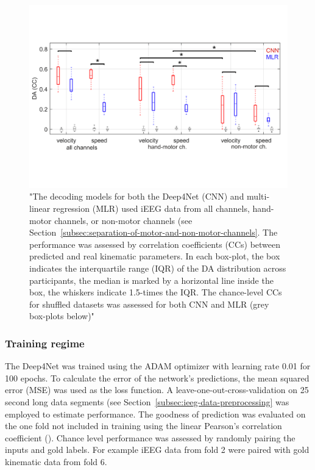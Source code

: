 \begin{figure}[!htpb]
\centering
   \includegraphics[width=0.8\linewidth]{img/ch2/hammer-decoding-acc}
   \caption[Orignial Deep4Net performance]{"The decoding models for both the Deep4Net (CNN) and multi-linear regression (MLR) used iEEG data from all channels, hand-motor channels, or non-motor channels (see Section~\ref{subsec:separation-of-motor-and-non-motor-channels}.
   The performance was assessed by correlation coefficients (CCs) between predicted and real kinematic parameters.
   In each box-plot, the box indicates the interquartile range (IQR) of the DA distribution across participants, the median is marked by a horizontal line inside the box, the whiskers indicate 1.5-times the IQR.
   The chance-level CCs for shuffled datasets was assessed for both CNN and MLR (grey box-plots below)"~\cite{Hammer-2021}}
    \label{fig:hammer-performance}
\end{figure}

\subsubsection{Training regime}
The Deep4Net was trained using the ADAM optimizer with learning rate 0.01 for 100 epochs.
To calculate the error of the network's predictions, the mean squared error (MSE) was used as the loss function.
A leave-one-out-cross-validation on 25 second long data segments (see Section~\ref{subsec:ieeg-data-preprocessing} was employed to estimate performance.
The goodness of prediction was evaluated on the one fold not included in training using the linear Pearson's correlation coefficient (\cite{pearson-vii-1895}).
Chance level performance was assessed by randomly pairing the inputs and gold labels.
For example iEEG data from fold 2 were paired with gold kinematic data from fold 6.

